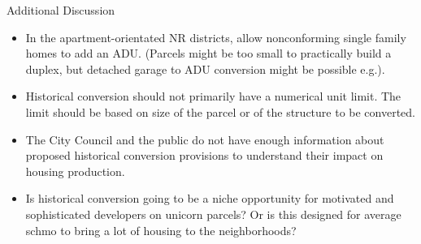 \documentclass{beamer}
\begin{document}
\begin{frame}{Additional Discussion}
    \begin{itemize}
    \item In the apartment-orientated NR districts, allow nonconforming single family homes to add an ADU. (Parcels might be too small to practically build a duplex, but detached garage to ADU conversion might be possible e.g.).
    \item Historical conversion should not primarily have a numerical unit limit. The limit should be based on size of the parcel or of the structure to be converted. 
    \item The City Council and the public do not have enough information about proposed historical conversion provisions to understand their impact on housing production.
    \item Is historical conversion going to be a niche opportunity for motivated and sophisticated developers on unicorn parcels? Or is this designed for average schmo to bring a lot of housing to the neighborhoods? 
    \end{itemize}
\end{frame}
\end{document}
